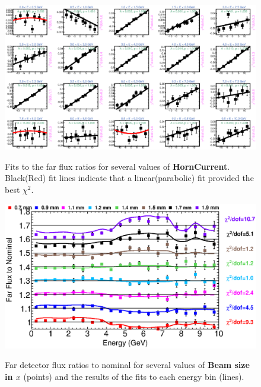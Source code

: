 \begin{figure}[ht]
  \begin{center}
    {\includegraphics[width=5.0in]{figures/HornCurrent_far_fits.eps}}
  \end{center}
\caption{ Fits to the far flux ratios for several values of {\bf HornCurrent}. Black(Red) fit lines indicate that a linear(parabolic) fit provided the best $\chi^2$. }
\end{figure}

\begin{figure}[ht]
  \begin{center}
    {\includegraphics[width=6.0in]{figures/BeamSigmaX_far_summary.eps}}
  \end{center}
\caption{ Far detector flux ratios to nominal for several values of {\bf Beam size in $x$} (points) and the results of the fits to each energy bin (lines).}
\end{figure}

